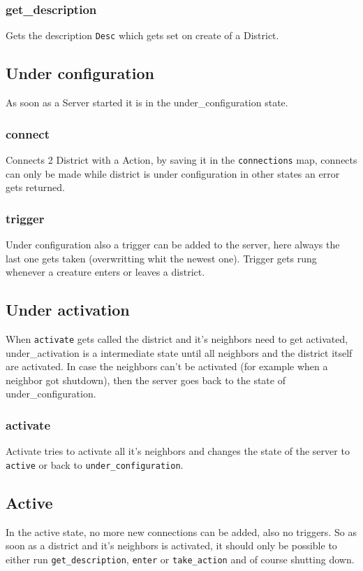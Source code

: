 \documentclass[11pt,a4paper]{article}
\begin{document}
\subsubsection{get\_description}
Gets the description \texttt{Desc} which gets set on create of a District.

\subsection{Under configuration}
As soon as a Server started it is in the under\_configuration state.
\subsubsection{connect}
Connects 2 District with a Action, by saving it in the \texttt{connections} map, 
connects can only be made while district is under configuration in other states an error gets returned.

\subsubsection{trigger}
Under configuration also a trigger can be added to the server, here always the last one gets taken (overwritting whit the newest one).
Trigger gets rung whenever a creature enters or leaves a district.

\subsection{Under activation}
When \texttt{activate} gets called the district and it's neighbors need to get activated, under\_activation is a intermediate state until all neighbors and the district itself are activated.
In case the neighbors can't be activated (for example when a neighbor got shutdown), then the server goes back to the state of under\_configuration.

\subsubsection{activate}
Activate tries to activate all it's neighbors and changes the state of the server to \texttt{active} or back to \texttt{under\_configuration}.

\subsection{Active}
In the active state, no more new connections can be added, also no triggers.
So as soon as a district and it's neighbors is activated, it should only be possible to either run \texttt{get\_description}, \texttt{enter} or \texttt{take\_action} and of course shutting down.
\end{document}
